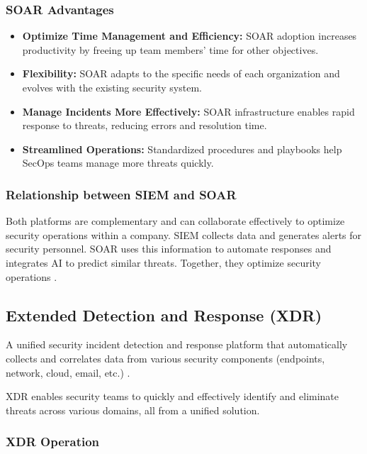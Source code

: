 \subsubsection{SOAR Advantages}

\begin{itemize}
    \item \textbf{Optimize Time Management and Efficiency:} SOAR adoption increases productivity by freeing up team members' time for other objectives.
    \item \textbf{Flexibility:} SOAR adapts to the specific needs of each organization and evolves with the existing security system.
    \item \textbf{Manage Incidents More Effectively:} SOAR infrastructure enables rapid response to threats, reducing errors and resolution time.
    \item \textbf{Streamlined Operations:} Standardized procedures and playbooks help SecOps teams manage more threats quickly.
\end{itemize}

\subsubsection{Relationship between SIEM and SOAR}

Both platforms are complementary and can collaborate effectively to optimize security operations within a company. SIEM collects data and generates alerts for security personnel. SOAR uses this information to automate responses and integrates AI to predict similar threats. Together, they optimize security operations \cite{ref36}.

\subsection{Extended Detection and Response (XDR)}
\label{subsec:xdr}

A unified security incident detection and response platform that automatically collects and correlates data from various security components (endpoints, network, cloud, email, etc.) \cite{ref37}.

XDR enables security teams to quickly and effectively identify and eliminate threats across various domains, all from a unified solution.

\subsubsection{XDR Operation}

